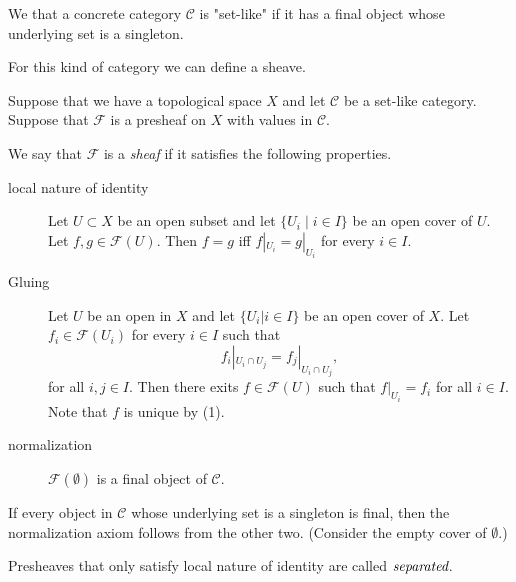 \begin{definition}
	We that a concrete category $\mathcal{C} $ is "set-like" if it has a final object whose underlying set is a singleton.	
\end{definition}
For this kind of category we can define a sheave.

Suppose that we have a topological space $X$ and let $\mathcal{C} $ be a set-like category. 
Suppose that $\mathcal{F} $ is a presheaf on $X$ with values in $\mathcal{C} $.

\begin{definition}
	We say that $\mathcal{F} $ is a \emph{sheaf} if it satisfies the following properties.
	\begin{description}
		\item[local nature of identity] Let $U \subset X$ be an open subset and let $\{U_i \;|\; i \in I\} $ be an open cover of $U$. Let $f, g \in \mathcal{F} (U)$.
			Then $f = g$ iff $f|_{U_i} = g|_{U_i}$ for every $i \in I$.
		\item[Gluing] Let $U$ be an open in $X$ and let $\{U_i | i \in I\} $ be an open cover of $X$. Let $f_i \in \mathcal{F} (U_i)$ for every $i \in I$ such that \[
		f_i|_{U_i \cap U_j} = f_j |_{U_i \cap U_j}
		,\]  
		for all $i, j \in  I$.
		Then there exits $f \in \mathcal{F} (U)$ such that $f|_{U_i} = f_i$ for all $i \in I$. Note that $f$ is unique by (1).
	\item[normalization] $\mathcal{F} (\emptyset)$ is a final object of $\mathcal{C} $. 
	\end{description}
\end{definition}
\begin{remark}
	If every object in $\mathcal{C} $ whose underlying set is a singleton is final, then the normalization axiom follows from the other two. 
	(Consider the empty cover of $\emptyset$.)
\end{remark}
\begin{definition}
	Presheaves that only satisfy local nature of identity  are called $\emph{separated}$.
\end{definition}

